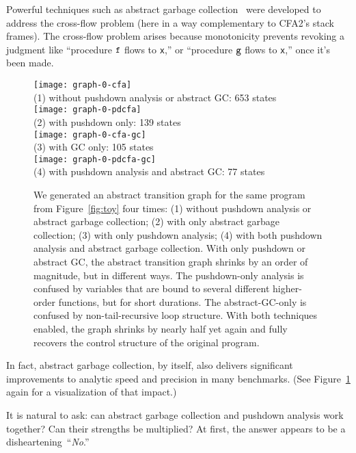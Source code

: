 Powerful techniques such as abstract garbage collection~\cite{mattmight:Might:2006:GammaCFA}
were developed to address the cross-flow problem (here in a way complementary to CFA2's stack frames).
The cross-flow problem arises because monotonicity prevents revoking a
judgment like ``procedure ${\tt f}$ flows to {\tt x},'' or ``procedure
${\tt g}$ flows to {\tt x},'' once it's been made.

\begin{figure}
\begin{center}
\texttt{[image: graph-0-cfa]}
\\
(1) without pushdown analysis or abstract GC: 653 states
\\
\texttt{[image: graph-0-pdcfa]}
\\
(2) with pushdown only: 139 states
\\
\texttt{[image: graph-0-cfa-gc]}
\\
(3) with GC only: 105 states
\\
\texttt{[image: graph-0-pdcfa-gc]}
\\
(4) with pushdown analysis and abstract GC: 77 states
\end{center}

\caption{
We generated an abstract transition graph
for the same program from Figure~\ref{fig:toy} four times: 
 (1) without pushdown analysis or abstract garbage collection;
 (2) with only abstract garbage collection;
 (3) with only pushdown analysis;
 (4) with both pushdown analysis and abstract garbage collection.
With only pushdown or abstract GC, the abstract transition graph shrinks
by an order of magnitude, but in different ways.
The pushdown-only analysis is confused by variables 
that are bound to several different higher-order functions,
but for short durations.
The abstract-GC-only is confused by non-tail-recursive loop structure.
With both techniques enabled, the graph shrinks by nearly half yet again
and fully recovers the control structure of the original program.}
\label{fig:diamond}
\end{figure}


In fact, abstract garbage collection, by itself, also delivers significant
improvements to analytic speed and precision in many benchmarks.
(See Figure~\ref{fig:diamond} again for a visualization of that
impact.)


It is natural to ask: can abstract garbage collection and pushdown 
analysis work together?
Can their strengths be multiplied?
At first, the answer appears to be a disheartening~``\emph{No}.''




